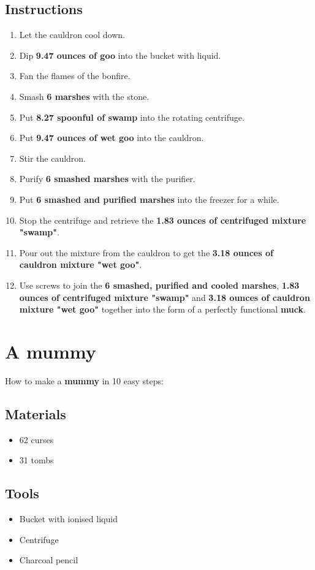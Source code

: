 \documentclass{article}
\begin{document}
\subsection{Instructions}\begin{enumerate}
\item 
Let the cauldron cool down.
\item 
Dip \textbf{9.47 ounces of goo} into the bucket with liquid.
\item 
Fan the flames of the bonfire.
\item 
Smash \textbf{6 marshes} with the stone.
\item 
Put \textbf{8.27 spoonful of swamp} into the rotating centrifuge.
\item 
Put \textbf{9.47 ounces of wet goo} into the cauldron.
\item 
Stir the cauldron.
\item 
Purify \textbf{6 smashed marshes} with the purifier.
\item 
Put \textbf{6 smashed and purified marshes} into the freezer for a while.
\item 
Stop the centrifuge and retrieve the \textbf{1.83 ounces of centrifuged mixture "swamp"}.
\item 
Pour out the mixture from the cauldron to get the \textbf{3.18 ounces of cauldron mixture "wet goo"}.
\item 
Use screws to join the \textbf{6 smashed, purified and cooled marshes}, \textbf{1.83 ounces of centrifuged mixture "swamp"} and \textbf{3.18 ounces of cauldron mixture "wet goo"} together into the form of a perfectly functional \textbf{muck}.
\end{enumerate}
\newpage
\section{A mummy}How to make a \textbf{mummy} in 10 easy steps:

\subsection{Materials}\begin{itemize}
\item 
62 curses
\item 
31 tombs
\end{itemize}
\subsection{Tools}\begin{itemize}
\item 
Bucket with ionised liquid
\item 
Centrifuge
\item 
Charcoal pencil
\end{itemize}
\end{document}
